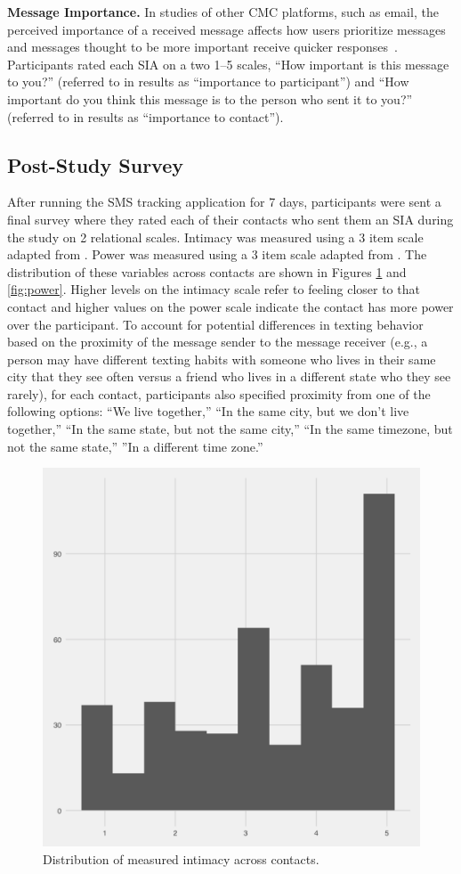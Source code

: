 \documentclass[12pt]{nuthesis}	%
\begin{document}
\textbf{Message Importance.} In studies of other CMC platforms, such as email, the perceived importance of a received message affects how users prioritize messages~\citep{siu2006going,tsugawa2012estimating} and messages thought to be more important receive quicker responses~\citep{dabbish2005understanding,wainer2011should}. Participants rated each SIA on a two 1--5 scales, ``How important is this message to you?'' (referred to in results as ``importance to participant'') and ``How important do you think this message is to the person who sent it to you?'' (referred to in results as ``importance to contact'').


\subsection{Post-Study Survey}

After running the SMS tracking application for 7 days, participants were sent a final survey where they rated each of their contacts who sent them an SIA during the study on 2 relational scales. Intimacy was measured using a 3 item scale adapted from \citet{miller1982assessment}. Power was measured using a 3 item scale adapted from \citet{farrell2015relationship}. The distribution of these variables across contacts are shown in Figures \ref{fig:intimacy} and \ref{fig:power}. Higher levels on the intimacy scale refer to feeling closer to that contact and higher values on the power scale indicate the contact has more power over the participant.  To account for potential differences in texting behavior based on the proximity of the message sender to the message receiver (e.g., a person may have different texting habits with someone who lives in their same city that they see often versus a friend who lives in a different state who they see rarely), for each contact, participants also specified proximity from one of the following options: ``We live together,'' ``In the same city, but we don't live together,'' ``In the same state, but not the same city,'' ``In the same timezone, but not the same state,'' ''In a different time zone.''


\begin{figure}[h]
\centering
\includegraphics[width=.7\textwidth]{figures/intimacy_distribution}
\caption{Distribution of measured intimacy across contacts.}
\label{fig:intimacy}
\end{figure}
\end{document}
